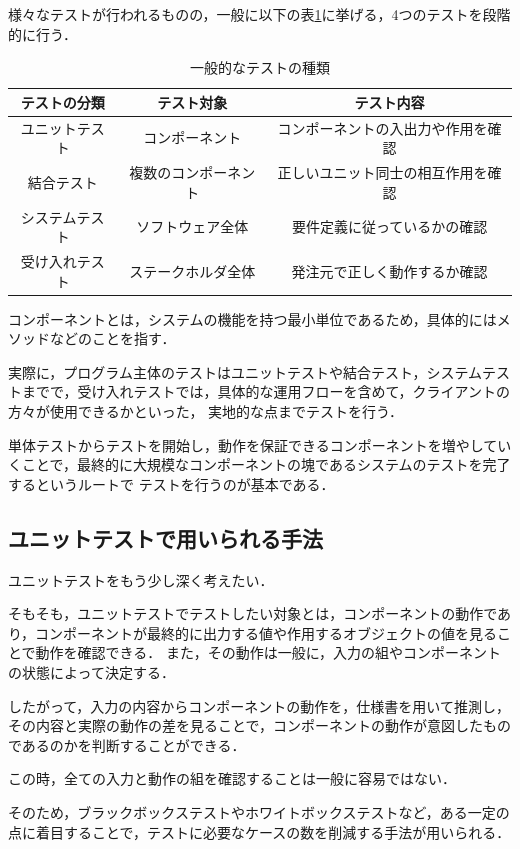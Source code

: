 \documentclass[platex,dvipdfmx,12pt]{jsarticle}
\begin{document}
様々なテストが行われるものの，一般に以下の表\ref{tab:tests}に挙げる，4つのテストを段階的に行う．

\begin{table}[H]
  \centering
  \caption{一般的なテストの種類}
  \label{tab:tests}
  \begin{tabular}{ccc}
    テストの分類 & テスト対象 & テスト内容 \\
    \hline
    ユニットテスト & コンポーネント & コンポーネントの入出力や作用を確認 \\
    結合テスト & 複数のコンポーネント & 正しいユニット同士の相互作用を確認 \\
    システムテスト & ソフトウェア全体 & 要件定義に従っているかの確認 \\
    受け入れテスト & ステークホルダ全体 & 発注元で正しく動作するか確認 \\
  \end{tabular}
\end{table}

コンポーネントとは，システムの機能を持つ最小単位であるため，具体的にはメソッドなどのことを指す．

実際に，プログラム主体のテストはユニットテストや結合テスト，システムテストまでで，受け入れテストでは，具体的な運用フローを含めて，クライアントの方々が使用できるかといった，
実地的な点までテストを行う．

単体テストからテストを開始し，動作を保証できるコンポーネントを増やしていくことで，最終的に大規模なコンポーネントの塊であるシステムのテストを完了するというルートで
テストを行うのが基本である．

\subsection{ユニットテストで用いられる手法}
ユニットテストをもう少し深く考えたい．

そもそも，ユニットテストでテストしたい対象とは，コンポーネントの動作であり，コンポーネントが最終的に出力する値や作用するオブジェクトの値を見ることで動作を確認できる．
また，その動作は一般に，入力の組やコンポーネントの状態によって決定する．

したがって，入力の内容からコンポーネントの動作を，仕様書を用いて推測し，その内容と実際の動作の差を見ることで，コンポーネントの動作が意図したものであるのかを判断することができる．

この時，全ての入力と動作の組を確認することは一般に容易ではない．

そのため，ブラックボックステストやホワイトボックステストなど，ある一定の点に着目することで，テストに必要なケースの数を削減する手法が用いられる．
\end{document}
